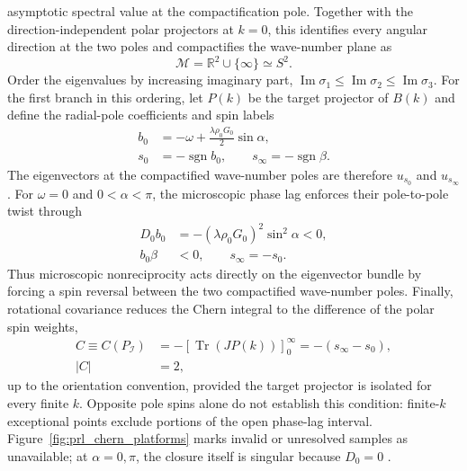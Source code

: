 \documentclass[aps,prl,reprint,superscriptaddress,nofootinbib,floatfix]{revtex4-2}
\begin{document}
asymptotic spectral value at the compactification pole. Together with the
direction-independent polar projectors at $k=0$, this identifies every angular
direction at the two poles and compactifies the wave-number plane as
\begin{equation}
  \mathcal M=\mathbb R^2\cup\{\infty\}\simeq S^2.
  \label{eq:prl_compactification}
\end{equation}
Order the eigenvalues by increasing imaginary part, $\operatorname{Im}\sigma_1\leq\operatorname{Im}\sigma_2\leq\operatorname{Im}\sigma_3$. For the first branch in this ordering, let $P(k)$ be the target projector of $B(k)$ and define the radial-pole coefficients and spin labels
\begin{equation}
  \begin{aligned}
  b_0&=-\omega+\frac{\lambda\rho_0G_0}{2}\sin\alpha,\\
  s_0&=-\operatorname{sgn}b_0,
  \qquad s_\infty=-\operatorname{sgn}\beta .
  \end{aligned}
  \label{eq:prl_pole_data}
\end{equation}
The eigenvectors at the compactified wave-number poles are therefore $u_{s_0}$ and $u_{s_\infty}$. For $\omega=0$ and $0<\alpha<\pi$, the microscopic phase lag enforces their pole-to-pole twist through
\begin{equation}
  \begin{aligned}
  D_0b_0&=-(\lambda\rho_0G_0)^2\sin^2\alpha<0,\\
  b_0\beta&<0,\qquad s_\infty=-s_0 .
  \end{aligned}
  \label{eq:prl_twist_condition}
\end{equation}
Thus microscopic nonreciprocity acts directly on the eigenvector bundle by forcing a spin reversal between the two compactified wave-number poles.
Finally, rotational covariance reduces the Chern integral to the difference of the polar spin weights,
\begin{equation}
  \begin{aligned}
  C\equiv C(P_{\mathcal I})&=-\left[\operatorname{Tr}(JP(k))\right]_{0}^{\infty}
  =-(s_\infty-s_0),\\
  |C|&=2,
  \end{aligned}
  \label{eq:prl_pole_chern}
\end{equation}
up to the orientation convention, provided the target projector is isolated for every finite $k$. Opposite pole spins alone do not establish this condition: finite-$k$ exceptional points exclude portions of the open phase-lag interval. Figure~\ref{fig:prl_chern_platforms} marks invalid or unresolved samples as unavailable; at $\alpha=0,\pi$, the closure itself is singular because $D_0=0$ \cite{Zhu2026MethodsAppendix}.
\end{document}
